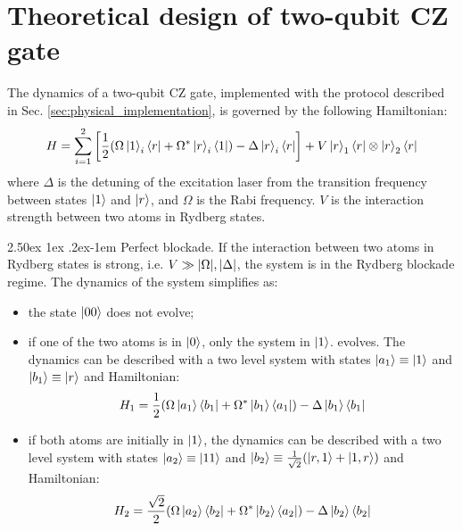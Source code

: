 \documentclass[rmp,10pt,onecolumn,fleqn,notitlepage]{revtex4-1}
\makeatletter
\renewcommand{\paragraph}{%
    \@startsection{paragraph}{4}%
    {\z@}{2.50ex \@plus 1ex \@minus .2ex}{-1em}%
    {\bf\sffamily}%
}
\makeatother
\begin{document}
\section{Theoretical design of two-qubit CZ gate}  
\label{sec:theoretical_design_CZ}
The dynamics of a two-qubit CZ gate, implemented with the protocol described in Sec. \ref{sec:physical_implementation}, is governed by the following Hamiltonian:
\begin{equation}
    H = \sum_{i=1}^{2}  \qty[ \frac{1}{2} \qty( \Omega \left\vert{1}\right\rangle_i \left\langle{r}\right\vert +
    \Omega^* \left\vert{r}\right\rangle_i \left\langle{1}\right\vert ) -
    \Delta \left\vert{r}\right\rangle_i \left\langle{r}\right\vert ] +
    V \left\vert{r}\right\rangle_1 \left\langle{r}\right\vert \otimes \left\vert{r}\right\rangle_2 \left\langle{r}\right\vert
\end{equation}
where $\Delta$ is the detuning of the excitation laser from the transition frequency between states $\left\vert{1}\right\rangle$ and $\left\vert{r}\right\rangle$, and $\Omega$ is the Rabi frequency. $V$ is the interaction strength between two atoms in Rydberg states. 

\paragraph{Perfect blockade.} If the interaction between two atoms in Rydberg states is strong, i.e. $V \gg \abs{\Omega}, \abs{\Delta}$, the system is in the Rydberg blockade regime. The dynamics of the system simplifies as:
\begin{itemize}
    \item the state $\left\vert{00}\right\rangle$ does not evolve;
    
    \item if one of the two atoms is in $\left\vert{0}\right\rangle$, only the system in $\left\vert{1}\right\rangle$. evolves. The dynamics can be described with a two level system with states $\left\vert{a_1}\right\rangle\equiv\left\vert{1}\right\rangle$ and $\left\vert{b_1}\right\rangle\equiv\left\vert{r}\right\rangle$ and Hamiltonian:
    \begin{equation}
        H_1 = \frac{1}{2} \qty( \Omega \left\vert{a_1}\right\rangle\left\langle{b_1}\right\vert + 
        \Omega^* \left\vert{b_1}\right\rangle\left\langle{a_1}\right\vert)
        - \Delta \left\vert{b_1}\right\rangle\left\langle{b_1}\right\vert
        \label{eq:perfect-H_1}
    \end{equation}
    
    \item if both atoms are initially in $\left\vert{1}\right\rangle$, the dynamics can be described with a two level system with states $\left\vert{a_2}\right\rangle\equiv\left\vert{11}\right\rangle$ and $\left\vert{b_2}\right\rangle\equiv \frac{1}{\sqrt{2}} \qty( \left\vert{r,1}\right\rangle + \left\vert{1,r}\right\rangle )$ and Hamiltonian:
    \begin{equation}
        H_2 = \frac{\sqrt{2}}{2} \qty( \Omega \left\vert{a_2}\right\rangle\left\langle{b_2}\right\vert + 
        \Omega^* \left\vert{b_2}\right\rangle\left\langle{a_2}\right\vert)
        - \Delta \left\vert{b_2}\right\rangle\left\langle{b_2}\right\vert
        \label{eq:perfect-H_2}
    \end{equation}
    
\end{itemize}
\end{document}
